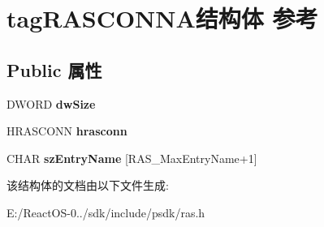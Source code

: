\hypertarget{structtag_r_a_s_c_o_n_n_a}{}\section{tag\+R\+A\+S\+C\+O\+N\+N\+A结构体 参考}
\label{structtag_r_a_s_c_o_n_n_a}
\subsection*{Public 属性}
\begin{DoxyCompactItemize}
\item 
\mbox{\label{structtag_r_a_s_c_o_n_n_a_a93f42255df819f9ac2610ced5dc481e3}} 
D\+W\+O\+RD {\bfseries dw\+Size}
\item 
\mbox{\label{structtag_r_a_s_c_o_n_n_a_a9ebfb366db0154fb8918a3c099cd3f29}} 
H\+R\+A\+S\+C\+O\+NN {\bfseries hrasconn}
\item 
\mbox{\label{structtag_r_a_s_c_o_n_n_a_a0188813dc987d8c36e12b5b0f8963747}} 
C\+H\+AR {\bfseries sz\+Entry\+Name} \mbox{[}R\+A\+S\+\_\+\+Max\+Entry\+Name+1\mbox{]}
\end{DoxyCompactItemize}


该结构体的文档由以下文件生成\+:\begin{DoxyCompactItemize}
\item 
E\+:/\+React\+O\+S-\/0../sdk/include/psdk/ras.\+h\end{DoxyCompactItemize}
